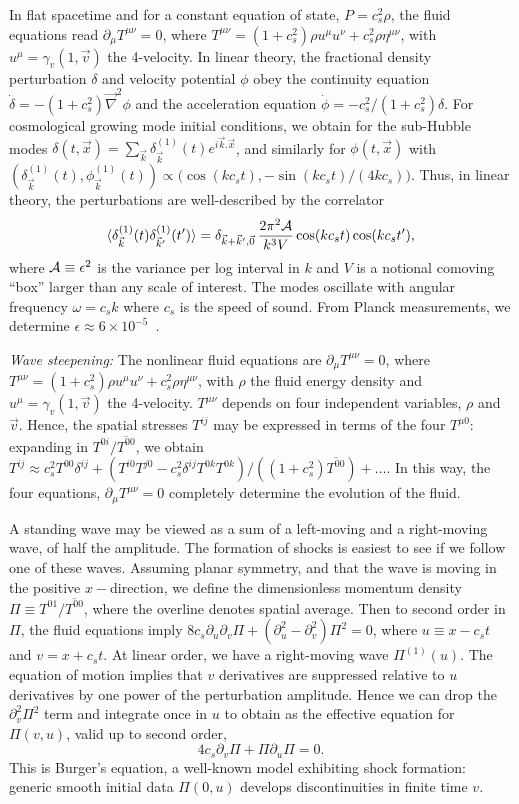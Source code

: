 \documentclass[prl,aps,10pt,twocolumn,showkeys,nofootinbib]{revtex4-1}
\def\ben{\begin{equation}}
\def\een{\end{equation}}
\def\be{\begin{equation}}
\def\ee{\end{equation}}
\begin{document}
In flat spacetime and for a constant equation of state, $P=c_s^2 \rho$, the fluid equations read $\partial_\mu T^{\mu \nu}=0$, where $T^{\mu \nu}=(1+c_s^2) \rho u^\mu u^\nu +c_s^2 \rho \eta^{\mu \nu}$, with $u^\mu=\gamma_{v}(1,\vec{v})$ the 4-velocity. In linear theory, the fractional density perturbation $\delta$ and velocity potential $\phi$ obey the continuity equation $\dot{\delta}=-(1+c_s^2) \vec{\nabla}^2 \phi$ and the acceleration equation $\dot{\phi}=-c_s^2/(1+c_s^2) \delta$. For cosmological growing mode initial conditions, we obtain for the sub-Hubble modes $\delta(t,\vec{x})=\sum_{\vec{k}} \delta^{(1)}_{\vec{k}} (t) e^{i\vec{k}.\vec{x}}$,  and similarly for $\phi(t,\vec{x})$ with $ ( \delta^{(1)}_{\vec{k}} (t) ,  \phi^{(1)}_{\vec{k}} (t) )\propto \bigl(\cos (k c_s t),-\sin (k c_s t)/(4 k c_s)\bigr).$ Thus, in linear theory, the perturbations are well-described by the correlator
\ben
\langle\delta^{(1)}_{\vec{k}}(t)\delta^{(1)}_{\vec{k}'}(t') \rangle=\delta_{\vec{k}+\vec{k}',\vec{0}}\,{2 \pi^2{ \cal A}\over k^3 V} \cos(k c_s t) \cos(k c_s t'),
\label{eq1}
\een
where ${\cal A}\equiv \epsilon^2$ is the variance per log interval in $k$ and $V$ is a notional comoving ``box'' larger than any scale of interest. The modes oscillate with angular frequency $\omega=c_s k$ where $c_s$ is the speed of sound. From Planck measurements, we determine $\epsilon\approx 6\times 10^{-5}$~\cite{foottilt}.

{\it Wave steepening:} 
The nonlinear fluid equations are $\partial_\mu T^{\mu \nu}=0$, where $T^{\mu \nu}=(1+c_s^2) \rho u^\mu u^\nu +c_s^2 \rho \eta^{\mu \nu}$, with $\rho$ the fluid energy density and $u^\mu=\gamma_{v}(1,\vec{v})$ the 4-velocity.  $T^{\mu \nu}$ depends on four independent variables, $\rho$ and $\vec{v}$. Hence, the spatial stresses $T^{ij}$ may be expressed in terms of the four $T^{\mu 0}$: expanding in $T^{0i}/\overline{T^{00}}$, we obtain $T^{ij}\approx c_s^2 T^{00}\delta^{ij} +(T^{i 0}T^{j 0}-c_s^2\delta^{ij} T^{0k} T^{0k})/((1+c_s^2)\overline{T^{00}})+\dots$. In this way, the four equations, $\partial_\mu T^{\mu \nu}=0$ completely determine the evolution of the fluid. 

A standing wave may be viewed as a sum of a left-moving and a right-moving wave, of half the amplitude. The formation of shocks is easiest to see if we follow one of these waves. Assuming planar symmetry, and that the wave is  moving in the positive $x-$direction, we define the dimensionless momentum density $\Pi\equiv T^{01}/\overline{T^{00}}$, where the overline denotes spatial average. Then to second order in $\Pi$, the fluid equations imply $8 c_s \partial_u \partial_v \Pi +(\partial_u^2-\partial_v^2)\Pi^2=0$, where $u\equiv x-c_s t$ and $v=x+c_s t$. At linear order, we have a right-moving wave $\Pi^{(1)}(u)$. The equation of motion implies that $v$ derivatives are suppressed relative to $u$ derivatives by one power of the perturbation amplitude. Hence we can drop the $\partial_v^2\Pi^2$ term and integrate once in $u$ to obtain as the effective equation for $\Pi(v,u)$, valid up to second order,
\be
4 c_s
\partial_v \Pi + \Pi \partial_u \Pi=0.
\label{eq2}
\ee
This is Burger's equation, a well-known model exhibiting shock formation: generic smooth initial data $\Pi(0,u)$ develops discontinuities in finite time $v$. 
\end{document}
